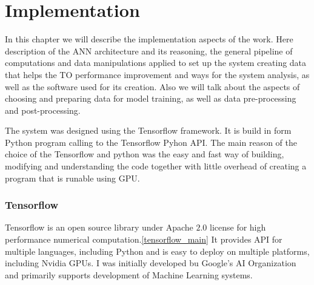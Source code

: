 
\chapter{Implementation}

In this chapter we will describe the implementation aspects of the work.
Here description of the ANN architecture and its reasoning, the general pipeline of computations and data manipulations applied to set up the system creating data that helps the TO performance improvement and ways for the system analysis, as well as the software used for its creation.
Also we will talk about the aspects of choosing and preparing data for model training, as well as data pre-processing and post-processing.
\medskip


The system was designed using the Tensorflow framework. 
It is build in form Python program calling to the Tensorflow Pyhon API.
The main reason of the choice of the Tensorflow and python was the easy and fast way of building, modifying and understanding the code together with little overhead of
creating a program that is runable using GPU. 
\medskip


\subsection{Tensorflow}

Tensorflow is an open source library under Apache $2.0$ license for high performance numerical computation.\ref{tensorflow_main} 
It provides API for multiple languages, including Python and is easy to deploy on multiple platforms, including Nvidia GPUs.
I was initially developed bu Google's AI Organization and primarily supports development of Machine Learning systems.
\medskip

